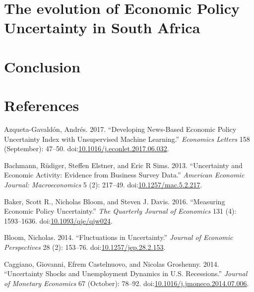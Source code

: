 \documentclass[11pt,preprint, authoryear]{elsarticle}
\numberwithin{equation}{section}
\numberwithin{figure}{section}
\numberwithin{table}{section}
\begin{document}
\section{\texorpdfstring{The evolution of Economic Policy Uncertainty in
South Africa
\label{sec_discuss}}{The evolution of Economic Policy Uncertainty in South Africa }}\label{the-evolution-of-economic-policy-uncertainty-in-south-africa}

\section{\texorpdfstring{Conclusion
\label{sec_conclude}}{Conclusion }}\label{conclusion}

\newpage

\section*{References}\label{references}

\hypertarget{refs}{}
\hypertarget{ref-Azqueta-Gavaldon2017}{}
Azqueta-Gavaldón, Andrés. 2017. ``Developing News-Based Economic Policy
Uncertainty Index with Unsupervised Machine Learning.'' \emph{Economics
Letters} 158 (September): 47--50.
doi:\href{https://doi.org/10.1016/j.econlet.2017.06.032}{10.1016/j.econlet.2017.06.032}.

\hypertarget{ref-Bachmann2013}{}
Bachmann, Rüdiger, Steffen Elstner, and Eric R Sims. 2013. ``Uncertainty
and Economic Activity: Evidence from Business Survey Data.''
\emph{American Economic Journal: Macroeconomics} 5 (2): 217--49.
doi:\href{https://doi.org/10.1257/mac.5.2.217}{10.1257/mac.5.2.217}.

\hypertarget{ref-Baker2016}{}
Baker, Scott R., Nicholas Bloom, and Steven J. Davis. 2016. ``Measuring
Economic Policy Uncertainty.'' \emph{The Quarterly Journal of Economics}
131 (4): 1593--1636.
doi:\href{https://doi.org/10.1093/qje/qjw024}{10.1093/qje/qjw024}.

\hypertarget{ref-Bloom2014}{}
Bloom, Nicholas. 2014. ``Fluctuations in Uncertainty.'' \emph{Journal of
Economic Perspectives} 28 (2): 153--76.
doi:\href{https://doi.org/10.1257/jep.28.2.153}{10.1257/jep.28.2.153}.

\hypertarget{ref-Caggiano2014}{}
Caggiano, Giovanni, Efrem Castelnuovo, and Nicolas Groshenny. 2014.
``Uncertainty Shocks and Unemployment Dynamics in U.S. Recessions.''
\emph{Journal of Monetary Economics} 67 (October): 78--92.
doi:\href{https://doi.org/10.1016/j.jmoneco.2014.07.006}{10.1016/j.jmoneco.2014.07.006}.
\end{document}
